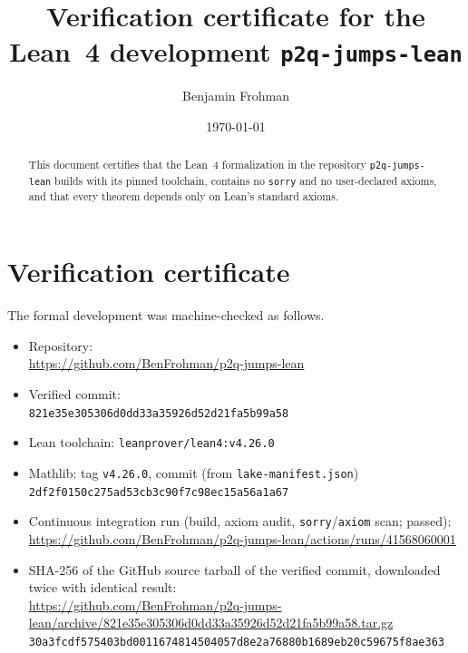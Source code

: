\documentclass[11pt]{amsart}
\title{Verification certificate for the Lean~4 development \texttt{p2q-jumps-lean}}
\author{Benjamin Frohman}
\date{\today}
\begin{document}
\begin{abstract}
This document certifies that the Lean~4 formalization in the repository \texttt{p2q-jumps-lean} builds with its pinned toolchain, contains no \texttt{sorry} and no user-declared axioms, and that every theorem depends only on Lean's standard axioms.
\end{abstract}
\maketitle
{}\par

\section{Verification certificate}

The formal development was machine-checked as follows.

{\raggedright
\begin{itemize}
\item Repository:\\ {\footnotesize\url{https://github.com/BenFrohman/p2q-jumps-lean}}
\item Verified commit:\\ {\footnotesize\texttt{821e35e305306d0dd33a35926d52d21fa5b99a58}}
\item Lean toolchain: \texttt{leanprover/lean4:v4.26.0}
\item Mathlib: tag \texttt{v4.26.0}, commit (from \texttt{lake-manifest.json})\\ {\footnotesize\texttt{2df2f0150c275ad53cb3c90f7c98ec15a56a1a67}}
\item Continuous integration run (build, axiom audit, \texttt{sorry}/\texttt{axiom} scan; passed):\\ {\footnotesize\url{https://github.com/BenFrohman/p2q-jumps-lean/actions/runs/41568060001}}
\item SHA-256 of the GitHub source tarball of the verified commit, downloaded twice with identical result:\\ {\footnotesize\url{https://github.com/BenFrohman/p2q-jumps-lean/archive/821e35e305306d0dd33a35926d52d21fa5b99a58.tar.gz}}\\
{\footnotesize\texttt{30a3fcdf575403bd0011674814504057d8e2a76880b1689eb20c59675f8ae363}}
\end{itemize}\par}
\end{document}
